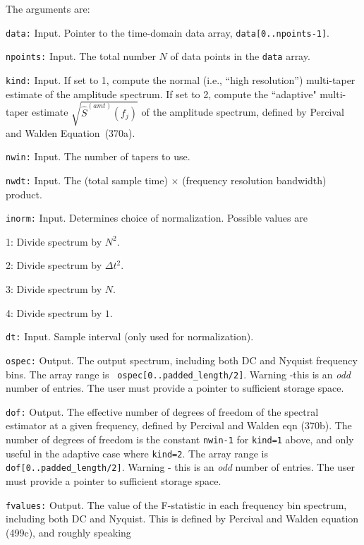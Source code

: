 The arguments are:
\begin{description}
\item{\tt data:} Input. Pointer to the time-domain data array, 
{\tt data[0..npoints-1]}.
\item{\tt npoints:} Input. 
The total number $N$ of data points in the {\tt data} array.
\item{\tt kind:} Input.  
  If set to 1, compute the normal (i.e., ``high resolution'') 
  multi-taper estimate of the amplitude spectrum.  
  If set to 2, compute the ``adaptive" multi-taper estimate
  $\sqrt{\hat S^{(amt)}(f_j)}$ of the amplitude spectrum, defined by 
  Percival and Walden Equation~(370a).
\item{\tt nwin:} Input.  The number of tapers to use.
\item{\tt nwdt:} Input.  The (total sample time) $\times$ (frequency
 resolution bandwidth) product.
\item{\tt inorm:} Input.  Determines choice of normalization.  
  Possible values are
\begin{description}
\item{1:}  Divide spectrum by $N^2$.
\item{2:}  Divide spectrum by $\Delta t^2$.
\item{3:}  Divide spectrum by $N$.
\item{4:}  Divide spectrum by $1$.
\end{description}
\item{\tt dt:}  Input.  Sample interval (only used for normalization).
\item{\tt ospec:} Output.  The output spectrum, including both DC and
  Nyquist frequency bins.  The array range is {\tt
  ospec[0..padded\_length/2]}. Warning -this is an {\it odd} number of entries.
  The user must provide a pointer to sufficient storage space.
\item{\tt dof:} Output.  The effective number of degrees of freedom
  of the spectral estimator at a given frequency, defined by Percival
  and Walden eqn (370b).  The number of degrees of freedom is the
  constant {\tt nwin-1} for {\tt kind=1} above, and only useful in
  the adaptive case where {\tt kind=2}.  The array range is {\tt
  dof[0..padded\_length/2]}. Warning - this is an {\it odd} number of entries.
  The user must provide a pointer to sufficient storage space.
\item{\tt fvalues:} Output. The value of the F-statistic in each
  frequency bin spectrum, including both DC and Nyquist.  This is
  defined by Percival and Walden equation (499c), and roughly speaking

\end{description}
